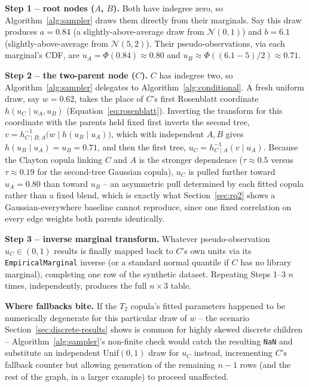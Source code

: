 \documentclass[
  english,
  class=report,
  accentcolor=2c,
  marginpar=false,
  parskip=half-,
  fontsize=11pt,
  ruledheaders=false,
  pdfa=false,
  IMRAD=false,
  thesis={type=master}
]{tudapub}
\begin{document}
\textbf{Step 1 -- root nodes ($A$, $B$).} Both have indegree zero, so
Algorithm~\ref{alg:sampler} draws them directly from their marginals. Say
this draw produces $a = 0.84$ (a slightly-above-average draw from
$\mathcal{N}(0,1)$) and $b = 6.1$ (slightly-above-average from
$\mathcal{N}(5,2)$). Their pseudo-observations, via each marginal's CDF,
are $u_A = \Phi(0.84) \approx 0.80$ and $u_B \approx \Phi((6.1-5)/2)
\approx 0.71$.

\textbf{Step 2 -- the two-parent node ($C$).} $C$ has indegree two, so
Algorithm~\ref{alg:sampler} delegates to Algorithm~\ref{alg:conditional}.
A fresh uniform draw, say $w = 0.62$, takes the place of $C$'s first
Rosenblatt coordinate $h(u_C \mid u_A, u_B)$ (Equation~\ref{eq:rosenblatt}).
Inverting the transform for this coordinate with the parents held fixed
first inverts the second tree, $v = h^{-1}_{C\mid B; A}\bigl(w \mid
h(u_B\mid u_A)\bigr)$, which with independent $A,B$ gives $h(u_B \mid u_A) =
u_B = 0.71$, and then the first tree, $u_C = h^{-1}_{C\mid A}(v \mid u_A)$.
Because the Clayton copula linking $C$ and $A$ is the stronger dependence
($\tau \approx 0.5$ versus $\tau \approx 0.19$ for the second-tree Gaussian
copula), $u_C$ is pulled further toward $u_A = 0.80$ than toward $u_B$ --
an asymmetric pull determined by each fitted copula rather than a fixed
blend, which is exactly what Section~\ref{sec:rq2} shows a
Gaussian-everywhere baseline cannot reproduce, since one fixed correlation
on every edge weights both parents identically.

\textbf{Step 3 -- inverse marginal transform.} Whatever pseudo-observation
$u_C \in (0,1)$ results is finally mapped back to $C$'s own units via its
\texttt{EmpiricalMarginal} inverse (or a standard normal quantile if $C$
has no library marginal), completing one row of the synthetic dataset.
Repeating Steps 1--3 $n$ times, independently, produces the full $n \times
3$ table.

\textbf{Where fallbacks bite.} If the $T_2$ copula's fitted parameters
happened to be numerically degenerate for this particular draw of $w$ --
the scenario Section~\ref{sec:discrete-results} shows is common for highly
skewed discrete children -- Algorithm~\ref{alg:sampler}'s non-finite check
would catch the resulting \texttt{NaN} and substitute an independent
$\text{Unif}(0,1)$ draw for $u_C$ instead, incrementing $C$'s fallback
counter but allowing generation of the remaining $n-1$ rows (and the rest
of the graph, in a larger example) to proceed unaffected.
\end{document}
